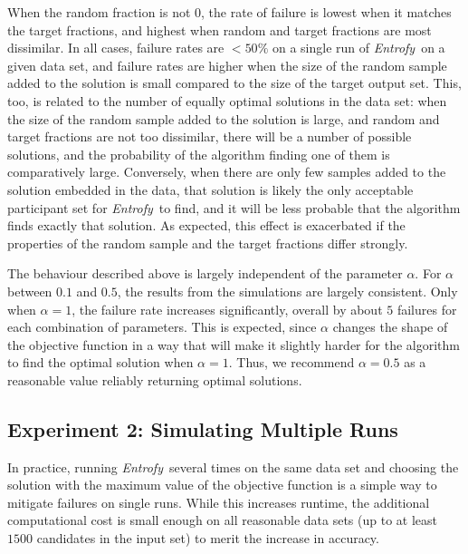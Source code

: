 \documentclass[10pt,letterpaper]{article}
\newcommand{\project}[1]{\textsl{#1}}
\newcommand{\entrofy}{\project{Entrofy}}
\begin{document}
When the random fraction is not $0$, the rate of failure is lowest when it matches the target fractions, and highest when random and target fractions are most dissimilar. In all cases, failure rates are $<50\%$ on a single run of \entrofy\ on a given data set, and failure rates are higher when the size of the random sample added to the solution is small compared to the size of the target output set. This, too, is related to the number of equally optimal solutions in the data set: when the size of the random sample added to the solution is large, and random and target fractions are not too dissimilar, there will be a number of possible solutions, and the probability of the algorithm finding one of them is comparatively large. Conversely, when there are only few samples added to the solution embedded in the data, that solution is likely the only acceptable participant set for \entrofy\ to find, and it will be less probable that the algorithm finds exactly that solution. As expected, this effect is exacerbated if the properties of the random sample and the target fractions differ strongly.

The behaviour described above is largely independent of the parameter $\alpha$. For $\alpha$ between $0.1$ and $0.5$, the results from the simulations are largely consistent. Only when $\alpha = 1$, the failure rate increases significantly, overall by about $5$ failures for each combination of parameters. This is expected, since $\alpha$ changes the shape of the objective function in a way that will make it slightly harder for the algorithm to find the optimal solution when $\alpha = 1$. Thus, we recommend $\alpha = 0.5$ as a reasonable value reliably returning optimal solutions.

\subsection*{Experiment 2: Simulating Multiple Runs}
In practice, running \entrofy\ several times on the same data set and choosing the solution with the maximum value of the objective function is a simple way to mitigate failures on single runs. While this increases runtime, the additional computational cost is small enough on all reasonable data sets (up to at least $1500$ candidates in the input set) to merit the increase in accuracy.
\end{document}
